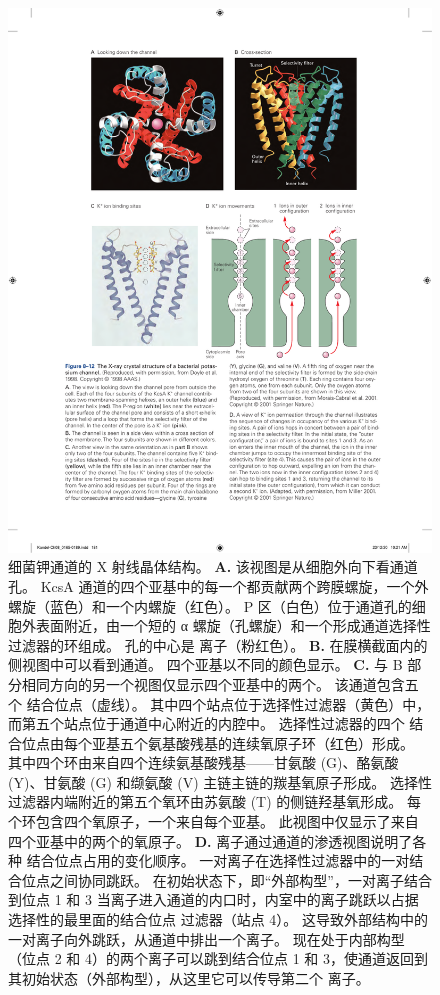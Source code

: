 \begin{figure}[htbp]
	\centering
	\includegraphics[width=0.7\linewidth]{chap08/fig_8_12}
	\caption{细菌钾通道的 X 射线晶体结构\cite{doyle1998structure}。
		\textbf{A.} 该视图是从细胞外向下看通道孔。
		KcsA  通道的四个亚基中的每一个都贡献两个跨膜螺旋，一个外螺旋（蓝色）和一个内螺旋（红色）。
		P 区（白色）位于通道孔的细胞外表面附近，由一个短的 α 螺旋（孔螺旋）和一个形成通道选择性过滤器的环组成。
		孔的中心是  离子（粉红色）。
		\textbf{B.} 在膜横截面内的侧视图中可以看到通道。 四个亚基以不同的颜色显示。
		\textbf{C.} 与 B 部分相同方向的另一个视图仅显示四个亚基中的两个。
		该通道包含五个  结合位点（虚线）。
		其中四个站点位于选择性过滤器（黄色）中，而第五个站点位于通道中心附近的内腔中。
		选择性过滤器的四个  结合位点由每个亚基五个氨基酸残基的连续氧原子环（红色）形成。
		其中四个环由来自四个连续氨基酸残基——甘氨酸 (G)、酪氨酸 (Y)、甘氨酸 (G) 和缬氨酸 (V) 主链主链的羰基氧原子形成。
		选择性过滤器内端附近的第五个氧环由苏氨酸 (T) 的侧链羟基氧形成。
		每个环包含四个氧原子，一个来自每个亚基。
		此视图中仅显示了来自四个亚基中的两个的氧原子\cite{morais2001energetic}。
		\textbf{D.}  离子通过通道的渗透视图说明了各种  结合位点占用的变化顺序。
		一对离子在选择性过滤器中的一对结合位点之间协同跳跃。
		在初始状态下，即“外部构型”，一对离子结合到位点 1 和 3
		当离子进入通道的内口时，内室中的离子跳跃以占据选择性的最里面的结合位点 过滤器（站点 4）。
		这导致外部结构中的一对离子向外跳跃，从通道中排出一个离子。
		现在处于内部构型（位点 2 和 4）的两个离子可以跳到结合位点 1 和 3，使通道返回到其初始状态（外部构型），从这里它可以传导第二个  离子\cite{miller2001see}。}
	\label{fig:8_12}
\end{figure}


